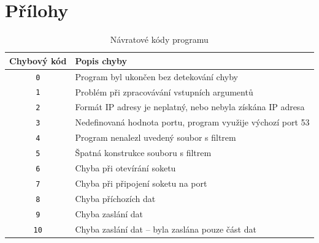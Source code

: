\documentclass[a4paper, 11pt]{article}
\begin{document}
	\section{Přílohy}
\begin{table}[h]
\centering
\begin{tabular}{cl}
\textbf{Chybový kód} & \textbf{Popis chyby}                                                                                   \\ \hline
\texttt{0}  & Program byl ukončen bez detekování chyby                                                      \\ \hline
\texttt{1}  & Problém při zpracovávání vstupních argumentů                                                     \\ \hline
\texttt{2}  & Formát IP adresy je neplatný, nebo nebyla získána IP adresa\\ \hline
\texttt{3}  & Nedefinovaná hodnota portu, program využije výchozí port 53                                   \\ \hline
\texttt{4} & Program nenalezl uvedený soubor s filtrem                                                     \\ \hline
\texttt{5}  & Špatná konstrukce souboru s filtrem                                                           \\ \hline
\texttt{6}  & Chyba při otevírání soketu                                                                    \\ \hline
\texttt{7}  & Chyba při připojení soketu na port                                                            \\ \hline
\texttt{8}  & Chyba příchozích dat                                                                          \\ \hline
\texttt{9}  & Chyba zaslání dat                                                                             \\ \hline
\texttt{10} & Chyba zaslání dat – byla zaslána pouze část dat                                              
\end{tabular}
\caption{Návratové kódy programu}
\label{tab:1}
\end{table}
\end{document}
